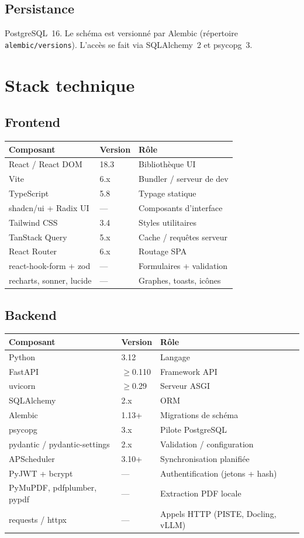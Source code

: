 \documentclass[11pt,a4paper]{article}
\newcommand{\code}[1]{\texttt{\small #1}}
\begin{document}
\subsection{Persistance}
PostgreSQL~16. Le schéma est versionné par Alembic (répertoire
\code{alembic/versions}). L'accès se fait via SQLAlchemy~2 et psycopg~3.

\section{Stack technique}

\subsection{Frontend}
\begin{longtable}{p{4.5cm} p{4cm} p{6cm}}
\toprule
\textbf{Composant} & \textbf{Version} & \textbf{Rôle} \\
\midrule
\endhead
React / React DOM & 18.3 & Bibliothèque UI \\
Vite & 6.x & Bundler / serveur de dev \\
TypeScript & 5.8 & Typage statique \\
shadcn/ui + Radix UI & --- & Composants d'interface \\
Tailwind CSS & 3.4 & Styles utilitaires \\
TanStack Query & 5.x & Cache / requêtes serveur \\
React Router & 6.x & Routage SPA \\
react-hook-form + zod & --- & Formulaires + validation \\
recharts, sonner, lucide & --- & Graphes, toasts, icônes \\
\bottomrule
\end{longtable}

\subsection{Backend}
\begin{longtable}{p{4.5cm} p{4cm} p{6cm}}
\toprule
\textbf{Composant} & \textbf{Version} & \textbf{Rôle} \\
\midrule
\endhead
Python & 3.12 & Langage \\
FastAPI & $\geq$0.110 & Framework API \\
uvicorn & $\geq$0.29 & Serveur ASGI \\
SQLAlchemy & 2.x & ORM \\
Alembic & 1.13+ & Migrations de schéma \\
psycopg & 3.x & Pilote PostgreSQL \\
pydantic / pydantic-settings & 2.x & Validation / configuration \\
APScheduler & 3.10+ & Synchronisation planifiée \\
PyJWT + bcrypt & --- & Authentification (jetons + hash) \\
PyMuPDF, pdfplumber, pypdf & --- & Extraction PDF locale \\
requests / httpx & --- & Appels HTTP (PISTE, Docling, vLLM) \\
\bottomrule
\end{longtable}
\end{document}
